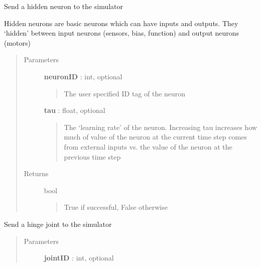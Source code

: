 \documentclass[letterpaper,10pt,english]{sphinxmanual}
\begin{document}
\begin{fulllineitems}
\begin{fulllineitems}
\end{fulllineitems}


\begin{fulllineitems}
\label{code:pyrosim.PYROSIM.Send_Hidden_Neuron}
Send a hidden neuron to the simulator

Hidden neurons are basic neurons which can have inputs and outputs. 
They `hidden' between input neurons (sensors, bias, function) and 
output neurons (motors)
\begin{quote}\begin{description}
\item[{Parameters}] \leavevmode
\textbf{neuronID} : int, optional
\begin{quote}

The user specified ID tag of the neuron
\end{quote}

\textbf{tau} : float, optional
\begin{quote}

The `learning rate' of the neuron. Increasing tau increases
how much of value of the neuron at the current time step comes
from external inputs vs. the value of the neuron at the previous
time step
\end{quote}

\item[{Returns}] \leavevmode
bool
\begin{quote}

True if successful, False otherwise
\end{quote}

\end{description}\end{quote}

\end{fulllineitems}


\begin{fulllineitems}
\label{code:pyrosim.PYROSIM.Send_Joint}
Send a hinge joint to the simulator
\begin{quote}\begin{description}
\item[{Parameters}] \leavevmode
\textbf{jointID} : int, optional
\begin{quote}


\end{quote}
\end{description}
\end{quote}
\end{fulllineitems}
\end{fulllineitems}
\end{document}
